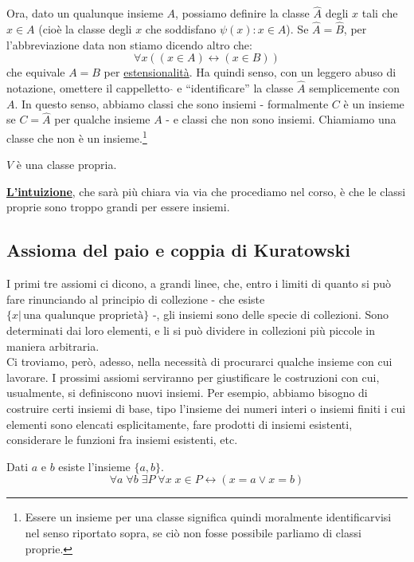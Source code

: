 \documentclass[11pt]{scrartcl}
\begin{document}
Ora, dato un qualunque insieme $A$, possiamo definire la classe $\hat{A}$ degli $x$ tali che $x \in A$ (cioè la classe degli $x$ che soddisfano $\psi(x) : x \in A$). Se $\hat{A} = \hat{B}$, per l'abbreviazione data non stiamo dicendo altro che:
\[ \forall x ((x \in A) \leftrightarrow (x \in B))
	\]
che equivale $A = B$ per \hyperref[ax2]{estensionalità}. Ha quindi senso, con un leggero abuso di notazione, omettere il cappelletto $\hat{}$ e ``identificare'' la classe $\hat{A}$ semplicemente con $A$. In questo senso,
abbiamo classi che sono insiemi - formalmente $C$ è un insieme se $C = \hat{A}$ per qualche insieme $A$ - e classi che non sono insiemi. Chiamiamo  una classe che non è un insieme.\footnote{Essere un insieme per una classe significa quindi moralmente identificarvisi nel senso riportato sopra, se ciò non fosse possibile parliamo di classi proprie.}

\begin{example}
$V$ è una classe propria.
\end{example}

\textbf{\underline{L'intuizione}}, che sarà più chiara via via che procediamo nel corso, è che le classi proprie sono troppo grandi per essere insiemi.

\subsection{Assioma del paio e coppia di Kuratowski}
I primi tre assiomi ci dicono, a grandi linee, che, entro i limiti di quanto si può fare rinunciando al principio di collezione - che esiste $\{x | \, \text{una qualunque proprietà}\}$ -, gli insiemi sono delle specie di collezioni.
Sono determinati dai loro elementi, e li si può dividere in collezioni più piccole in maniera arbitraria. \\ Ci troviamo, però, adesso, nella necessità di procurarci qualche insieme con cui lavorare. I prossimi assiomi serviranno per giustificare le costruzioni con cui,
usualmente, si definiscono nuovi insiemi. Per esempio, abbiamo bisogno di costruire certi insiemi di base, tipo l'insieme dei numeri interi o insiemi finiti i cui elementi sono elencati esplicitamente, fare prodotti di insiemi esistenti, 
considerare le funzioni fra insiemi esistenti, etc.

\begin{axiom}
\label{ax4}
Dati $a$ e $b$ esiste l'insieme $\{a,b\}$.
\[ \forall a \; \forall b \; \exists P \; \forall x \; x \in P \leftrightarrow (x = a \lor x = b)
	\]
\end{axiom}
\end{document}
